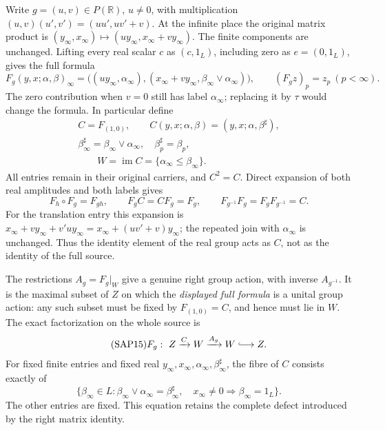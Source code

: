 Write $g=(u,v)\in P(\mathbb R)$, $u\ne0$, with multiplication
$(u,v)(u',v')=(uu',uv'+v)$. At the infinite place the original
matrix product is $(y_\infty,x_\infty)\mapsto
(u y_\infty,x_\infty+v y_\infty)$. The finite components are
unchanged. Lifting every real scalar $c$ as $(c,1_L)$, including
zero as $e=(0,1_L)$, gives the full formula
\begin{equation}\tag{SAP12}
F_g(y,x;\alpha,\beta)_\infty
 =\bigl((u y_\infty,\alpha_\infty),
        (x_\infty+v y_\infty,\beta_\infty\vee\alpha_\infty)\bigr),
\qquad (F_gz)_p=z_p\ (p<\infty).
\end{equation}
The zero contribution when $v=0$ still has label
$\alpha_\infty$; replacing it by $\tau$ would change the formula.
In particular define
\begin{equation}\tag{SAP13}
\begin{gathered}
C=F_{(1,0)},\qquad
C(y,x;\alpha,\beta)
 =(y,x;\alpha,\beta^{\sharp}),\\
\beta^{\sharp}_\infty=\beta_\infty\vee\alpha_\infty,
\quad\beta^{\sharp}_p=\beta_p,\\
\qquad W=\operatorname{im}C
 =\{\alpha_\infty\le\beta_\infty\}.
\end{gathered}
\end{equation}
All entries remain in their original carriers, and $C^2=C$.
Direct expansion of both real amplitudes and both labels gives
\begin{equation}\tag{SAP14}
F_h\circ F_g=F_{gh},\qquad
F_gC=CF_g=F_g,\qquad
F_{g^{-1}}F_g=F_gF_{g^{-1}}=C.
\end{equation}
For the translation entry this expansion is
$x_\infty+v y_\infty+v'u y_\infty
=x_\infty+(uv'+v)y_\infty$; the repeated join with
$\alpha_\infty$ is unchanged. Thus the identity element of the
real group acts as $C$, not as the identity of the full source.

The restrictions $A_g=F_g|_W$ give a genuine right group action,
with inverse $A_{g^{-1}}$. It is the maximal subset of $Z$ on
which the \emph{displayed full formula} is a unital group action:
any such subset must be fixed by $F_{(1,0)}=C$, and hence must
lie in $W$. The exact factorization on the whole source is
\begin{equation}\tag{SAP15}
F_g:\ Z\xrightarrow{C}W\xrightarrow{A_g}W\lhook\joinrel\longrightarrow Z.
\end{equation}
For fixed finite entries and fixed real $y_\infty,x_\infty,
\alpha_\infty,\beta^{\sharp}_\infty$, the fibre of $C$ consists
exactly of
\begin{equation}\tag{SAP16}
\{\beta_\infty\in L:
  \beta_\infty\vee\alpha_\infty=\beta^{\sharp}_\infty,
  \quad x_\infty\ne0\Rightarrow\beta_\infty=1_L\}.
\end{equation}
The other entries are fixed. This equation retains the complete
defect introduced by the right matrix identity.


